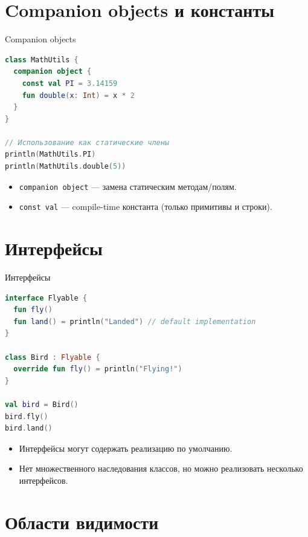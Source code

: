 \documentclass[aspectratio=169]{beamer}
\begin{document}
\section{Companion objects и константы}

\begin{frame}[fragile]{Companion objects}
  \begin{lstlisting}[language=Kotlin]
class MathUtils {
  companion object {
    const val PI = 3.14159
    fun double(x: Int) = x * 2
  }
}

// Использование как статические члены
println(MathUtils.PI)
println(MathUtils.double(5))
  \end{lstlisting}
  \begin{itemize}
    \item \texttt{companion object} — замена статическим методам/полям.
    \item \texttt{const val} — compile-time константа (только примитивы и строки).
  \end{itemize}
\end{frame}

\section{Интерфейсы}

\begin{frame}[fragile]{Интерфейсы}
  \begin{lstlisting}[language=Kotlin]
interface Flyable {
  fun fly()
  fun land() = println("Landed") // default implementation
}

class Bird : Flyable {
  override fun fly() = println("Flying!")
}

val bird = Bird()
bird.fly()
bird.land()
  \end{lstlisting}
  \begin{itemize}
    \item Интерфейсы могут содержать реализацию по умолчанию.
    \item Нет множественного наследования классов, но можно реализовать несколько интерфейсов.
  \end{itemize}
\end{frame}

\section{Области видимости}
\end{document}
